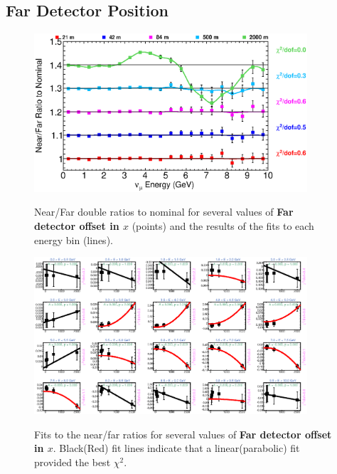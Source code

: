 \clearpage
\subsection{Far Detector Position}

\begin{figure}[ht]
  \begin{center}
    {\includegraphics[width=4.0in]{figures/LBNEFDX_nof_summary.eps}}
  \end{center}
\caption{ Near/Far double ratios to nominal for several values of {\bf Far detector offset in $x$} (points) and the results of the fits to each energy bin (lines).}
\end{figure}

\begin{figure}[hb]
  \begin{center}
    {\includegraphics[width=4.0in]{figures/LBNEFDX_nof_fits.eps}}
  \end{center}
\caption{ Fits to the near/far ratios for several values of {\bf Far detector offset in $x$}. Black(Red) fit lines indicate that a linear(parabolic) fit provided the best $\chi^2$. }
\end{figure}

